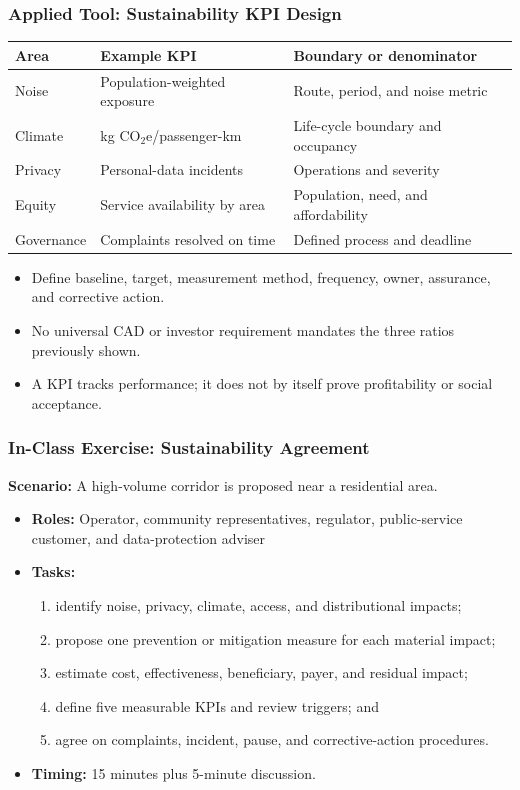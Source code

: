 \documentclass{beamer}
\begin{document}
\begin{frame}[t]
\frametitle{Applied Tool: Sustainability KPI Design}
\begin{center}\small
\begin{tabular}{l|l|l}
\textbf{Area} & \textbf{Example KPI} & \textbf{Boundary or denominator}\\
\hline
Noise & Population-weighted exposure & Route, period, and noise metric\\
Climate & kg $\mathrm{CO_2e}$/passenger-km & Life-cycle boundary and occupancy\\
Privacy & Personal-data incidents & Operations and severity\\
Equity & Service availability by area & Population, need, and affordability\\
Governance & Complaints resolved on time & Defined process and deadline\\
\end{tabular}
\end{center}
\vspace{0.25cm}
\begin{itemize}
\item Define baseline, target, measurement method, frequency, owner, assurance, and corrective action.
\item No universal CAD or investor requirement mandates the three ratios previously shown.
\item A KPI tracks performance; it does not by itself prove profitability or social acceptance.
\end{itemize}
\end{frame}

\begin{frame}[t]
\frametitle{In-Class Exercise: Sustainability Agreement}
\textbf{Scenario:} A high-volume corridor is proposed near a residential area.
\begin{itemize}
\item \textbf{Roles:} Operator, community representatives, regulator, public-service customer, and data-protection adviser
\item \textbf{Tasks:}
\begin{enumerate}
\item identify noise, privacy, climate, access, and distributional impacts;
\item propose one prevention or mitigation measure for each material impact;
\item estimate cost, effectiveness, beneficiary, payer, and residual impact;
\item define five measurable KPIs and review triggers; and
\item agree on complaints, incident, pause, and corrective-action procedures.
\end{enumerate}
\item \textbf{Timing:} 15 minutes plus 5-minute discussion.
\end{itemize}
\end{frame}
\end{document}
